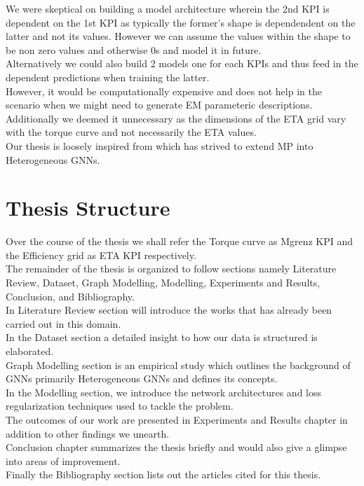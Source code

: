 \documentclass{report} %
\begin{document}
We were skeptical on building a model architecture wherein the 2nd KPI is dependent on the 1st KPI as typically the former's shape is dependendent on the latter and not its values.
However we can assume the values within the shape to be non zero values and otherwise 0s and model it in future.\\

Alternatively we could also build 2 models one for each KPIs and thus feed in the dependent predictions when training the latter. \\
However, it would be computationally expensive and does not help in the scenario when we might need to generate \ac{EM} parameteric descriptions.
Additionally we deemed it unnecessary as the dimensions of the ETA grid vary with the torque curve and not necessarily the ETA values. \\

Our thesis is loosely inspired from \cite{ML HGNN-2023} which has strived to extend \ac{MP} into Heterogeneous \ac{GNN}s.\\


\section{Thesis Structure}\label{sec:Thesis Structure}

Over the course of the thesis we shall refer the Torque curve as Mgrenz KPI and the Efficiency grid as ETA KPI respectively.\\
The remainder of the thesis is organized to follow sections namely Literature Review, Dataset, Graph Modelling, Modelling, Experiments and Results, Conclusion, and Bibliography.\\
In Literature Review section will introduce the works that has already been carried out in this domain. \\
In the Dataset section a detailed insight to how our data is structured is elaborated.\\
Graph Modelling section is an empirical study which outlines the background of \ac{GNN}s primarily Heterogeneous \ac{GNN}s and defines its concepts.\\
In the Modelling section, we introduce the network architectures and loss regularization techniques used to tackle the problem. \\
The outcomes of our work are presented in Experiments and Results chapter in addition to other findings we unearth.\\ 
Conclusion chapter summarizes the thesis briefly and would also give a glimpse into areas of improvement. \\
Finally the Bibliography section lists out the articles cited for this thesis.\\
\end{document}
